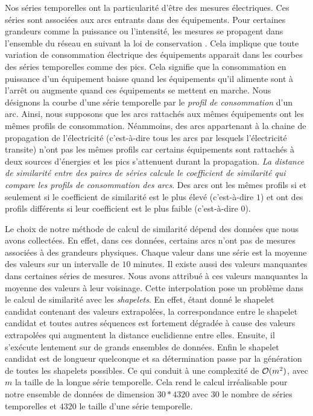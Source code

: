 Nos s\'eries temporelles ont la particularit\'e d'\^etre des mesures \'electriques. Ces s\'eries sont associ\'ees aux arcs entrants dans des \'equipements. Pour certaines grandeurs comme la puissance ou l'intensit\'e, les mesures se propagent dans l'ensemble du r\'eseau en suivant la loi de conservation \cite{loiDeConservation}. 
Cela implique que toute variation de consommation \'electrique des \'equipements apparait dans les courbes des s\'eries temporelles comme des pics. Cela signifie que la consommation en puissance d'un \'equipement
 baisse quand les \'equipements qu'il alimente sont \`a l'arr\^et ou 
 augmente quand ces \'equipements se mettent en marche.
Nous d\'esignons la courbe d'une s\'erie temporelle par le {\em profil de consommation} d'un arc. 
Ainsi, nous supposons que les arcs rattach\'es aux m\^emes \'equipements ont les m\^emes profils de consommation.
N\'eammoins, des arcs appartenant \`a la chaine de propagation de l'\'electricit\'e (c'est-\`a-dire tous les arcs par lesquels l'\'electricit\'e transite) n'ont pas les m\^emes profils car certains \'equipements sont rattach\'es \`a deux sources d'\'energies et les pics s'attenuent durant la propagation.
{\em La distance de similarit\'e entre des paires de s\'eries calcule le coefficient de similarit\'e qui compare les profils de consommation des arcs}. Des arcs ont les m\^emes profils  si et seulement si le coefficient de similarit\'e est le plus \'elev\'e (c'est-\`a-dire $1$) et ont des profils diff\'erents si  leur coefficient est le plus faible (c'est-\`a-dire $0$).
\newline

Le choix de notre m\'ethode de calcul de similarit\'e d\'epend des donn\'ees que nous avons collect\'ees. En effet, dans ces donn\'ees, certains arcs n'ont pas de mesures associ\'ees \`a des grandeurs physiques. Chaque valeur dans une s\'erie est la moyenne des valeurs sur un intervalle de $10$ minutes. 
Il existe aussi des valeurs manquantes dans certaines s\'eries de mesures. Nous avons attribu\'e \`a ces valeurs manquantes la moyenne des valeurs \`a leur voisinage. Cette interpolation pose un probl\`eme dans le calcul de similarit\'e avec les {\em shapelets}.
 En effet, \'etant donn\'e le shapelet candidat contenant des valeurs extrapol\'ees, la correspondance entre le shapelet candidat et toutes autres s\'equences est fortement d\'egrad\'ee \`a cause des valeurs extrapol\'ees qui augmentent la distance euclidienne entre elles. Ensuite, il s'ex\'ecute lentement sur de grands ensembles de donn\'ees. Enfin le shapelet candidat est de longueur quelconque et sa d\'etermination passe par la g\'en\'eration de toutes les shapelets possibles. 
 Ce qui conduit \`a une complexit\'e de ${\cal O}(m^2)$, avec $m$ la taille de la longue s\'erie temporelle. 
 Cela rend le calcul irr\'ealisable pour notre ensemble de donn\'ees de dimension $30 * 4320$ avec $30$ le nombre de s\'eries temporelles et $4320$ le taille d'une s\'erie temporelle.
\newline

